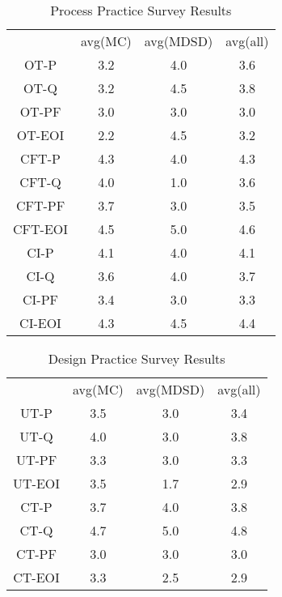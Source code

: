 \documentclass[final_report_innit.tex]{subfiles}
\newcommand\Tstrut{\rule{0pt}{2.6ex}}       %
\begin{document}
\begin{table}[h]
	\caption{Process Practice Survey Results}
	\begin{center}
		\begin{tabular}{cccc}
		
                             & avg(MC) & avg(MDSD) & avg(all) \Tstrut \\ 
		OT-P   & 3.2 & 4.0 & 3.6 \Tstrut \\ 
		OT-Q   & 3.2 & 4.5 & 3.8 \Tstrut \\ 
		OT-PF  & 3.0 & 3.0 & 3.0 \Tstrut \\ 
		OT-EOI & 2.2 & 4.5 & 3.2 \Tstrut \\
		CFT-P   & 4.3 & 4.0 & 4.3 \Tstrut \\ 
		CFT-Q   & 4.0 & 1.0 & 3.6 \Tstrut \\ 
		CFT-PF  & 3.7 & 3.0 & 3.5 \Tstrut \\ 
		CFT-EOI & 4.5 & 5.0 & 4.6 \Tstrut \\
		CI-P   & 4.1 & 4.0 & 4.1 \Tstrut \\ 
		CI-Q   & 3.6 & 4.0 & 3.7 \Tstrut \\ 
		CI-PF  & 3.4 & 3.0 & 3.3 \Tstrut \\ 
		CI-EOI & 4.3 & 4.5 & 4.4 \Tstrut \\  
		
		\end{tabular}
	\end{center}
\end{table}


\begin{table}[h]
	\caption{Design Practice Survey Results}
	\begin{center}
		\begin{tabular}{cccc}
		           & avg(MC) & avg(MDSD) & avg(all) \Tstrut \\ 
			UT-P   & 3.5 & 3.0 & 3.4 \Tstrut \\  
			UT-Q   & 4.0 & 3.0 & 3.8 \Tstrut \\ 
			UT-PF  & 3.3 & 3.0 & 3.3 \Tstrut \\ 
			UT-EOI & 3.5 & 1.7 & 2.9 \Tstrut \\ 
			CT-P   & 3.7 & 4.0 & 3.8 \Tstrut \\ 
			CT-Q   & 4.7 & 5.0 & 4.8 \Tstrut \\ 
			CT-PF  & 3.0 & 3.0 & 3.0 \Tstrut \\ 
			CT-EOI & 3.3 & 2.5 & 2.9 \Tstrut \\ 
		\end{tabular}
	\end{center}
\end{table}
\end{document}
